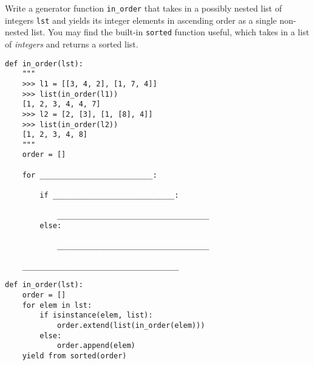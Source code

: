 \question
Write a generator function \lstinline{in_order} that takes in a possibly nested list of integers \lstinline{lst} and yields its integer elements in ascending order as a single non-nested list. You may find the built-in \lstinline{sorted} function useful, which takes in a list of \textit{integers} and returns a sorted list.

\begin{lstlisting}
def in_order(lst):
    """
    >>> l1 = [[3, 4, 2], [1, 7, 4]]
    >>> list(in_order(l1))
    [1, 2, 3, 4, 4, 7]
    >>> l2 = [2, [3], [1, [8], 4]]
    >>> list(in_order(l2))
    [1, 2, 3, 4, 8]
    """
    order = []

    for __________________________:

        if ____________________________:

            ___________________________________
        else:

            ___________________________________

    ____________________________________
\end{lstlisting}

\begin{solution}
\begin{lstlisting}
def in_order(lst):
    order = []
    for elem in lst:
        if isinstance(elem, list):
            order.extend(list(in_order(elem)))
        else:
            order.append(elem)
    yield from sorted(order)
\end{lstlisting}


\end{solution}
